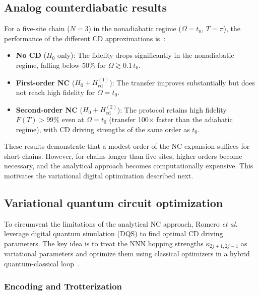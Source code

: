 \documentclass[
  reprint,
  amsmath,
  amssymb,
  aps,
  prb,
  longbibliography,
]{revtex4-2}
\begin{document}
\subsection{Analog counterdiabatic results}
\label{sec:cd_analog_results}

For a five-site chain ($N = 3$) in the nonadiabatic regime ($\Omega = t_0$,
$T = \pi$), the performance of the different CD approximations is~\cite{Romero2024}:

\begin{itemize}
  \item \textbf{No CD} ($H_0$ only): The fidelity drops
    significantly in the nonadiabatic regime, falling below 50\% for
    $\Omega \gtrsim 0.1\,t_0$.
  \item \textbf{First-order NC} ($H_0 + H_{\mathrm{cd}}^{(1)}$): The transfer
    improves substantially but does not reach high fidelity for
    $\Omega = t_0$.
  \item \textbf{Second-order NC} ($H_0 + H_{\mathrm{cd}}^{(2)}$): The protocol
    retains high fidelity $F(T) > 99\%$ even at $\Omega = t_0$
    (transfer 100$\times$ faster than the adiabatic regime), with CD driving
    strengths of the same order as $t_0$.
\end{itemize}

These results demonstrate that a modest order of the NC expansion suffices
for short chains. However, for chains longer than five sites, higher orders
become necessary, and the analytical approach becomes computationally expensive.
This motivates the variational digital optimization described next.

\subsection{Variational quantum circuit optimization}
\label{sec:cd_digital}

To circumvent the limitations of the analytical NC approach, Romero
\textit{et al.}~\cite{Romero2024} leverage digital quantum simulation (DQS)
to find optimal CD driving parameters. The key idea is to treat the
NNN hopping strengths $\kappa_{2j+1,2j-1}$ as variational parameters and
optimize them using classical optimizers in a hybrid
quantum-classical loop~\cite{Cerezo2021}.

\subsubsection{Encoding and Trotterization}
\end{document}
